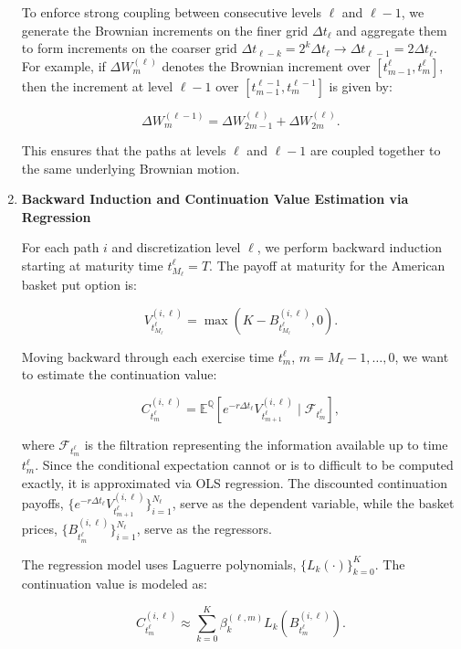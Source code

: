 \documentclass[titlepage]{article}
\begin{document}
\begin{enumerate}
    To enforce strong coupling between consecutive levels \(\ell\) and \(\ell-1\), we generate the Brownian increments on the finer grid \(\Delta t_\ell\) and aggregate them to form increments on the coarser grid \(\Delta t_{\ell-k} = 2^k \Delta t_\ell \rightarrow \Delta t_{\ell - 1} = 2 \Delta t_{\ell}\). For example, if \(\Delta W_{m}^{(\ell)}\) denotes the Brownian increment over \([t_{m-1}^\ell, t_{m}^\ell]\), then the increment at level \(\ell-1\) over \([t_{m-1}^{\ell-1}, t_m^{\ell-1}]\) is given by:

    \[
    \Delta W_m^{(\ell-1)} = \Delta W_{2m-1}^{(\ell)} + \Delta W_{2m}^{(\ell)}.
    \]

    This ensures that the paths at levels \(\ell\) and \(\ell-1\) are coupled together to the same underlying Brownian motion.

    \item \textbf{Backward Induction and Continuation Value Estimation via Regression}

    For each path \(i\) and discretization level \(\ell\), we perform backward induction starting at maturity time \(t_{M_\ell}^\ell = T\). The payoff at maturity for the American basket put option is:

    \[
    V_{t_{M_\ell}^\ell}^{(i, \ell)} = \max\left(K - B_{t_{M_\ell}^\ell}^{(i, \ell)}, 0 \right).
    \]

    Moving backward through each exercise time \(t_m^\ell\), \(m = M_\ell - 1, \dots, 0\), we want to estimate the continuation value:

    \[
    C_{t_m^\ell}^{(i, \ell)} = \mathbb{E}^{\mathbb{Q}} \left[ e^{-r \Delta t_\ell} V_{t_{m+1}^\ell}^{(i, \ell)} \mid \mathcal{F}_{t_m^\ell} \right],
    \]

    where \(\mathcal{F}_{t_m^\ell}\) is the filtration representing the information available up to time \(t_m^\ell\). Since the conditional expectation cannot or is to difficult to be computed exactly, it is approximated via OLS regression. The discounted continuation payoffs, \(\{ e^{-r \Delta t_\ell} V_{t_{m+1}^\ell}^{(i, \ell)} \}_{i=1}^{N_\ell}\), serve as the dependent variable, while the basket prices, \(\{ B_{t_m^\ell}^{(i, \ell)} \}_{i=1}^{N_\ell}\), serve as the regressors.

    The regression model uses Laguerre polynomials, \(\{L_k(\cdot)\}_{k=0}^K\). The continuation value is modeled as:

    \[
    C_{t_m^\ell}^{(i, \ell)} \approx \sum_{k=0}^K \beta_k^{(\ell, m)} L_k \left( B_{t_m^\ell}^{(i, \ell)} \right).
    \]


\end{enumerate}
\end{document}
